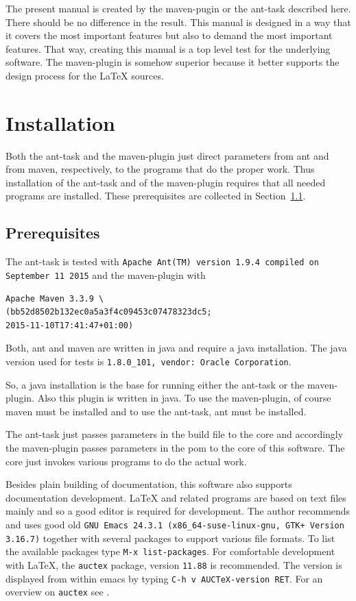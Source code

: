 \documentclass[12pt]{article}
\begin{document}
The present manual is created by the maven-pugin or the ant-task 
described here. 
There should be no difference in the result. 
This manual is designed in a way that it covers the most important features 
but also to demand the most important features. 
That way, creating this manual is a top level test 
for the underlying software. 
The maven-plugin is somehow superior 
because it better supports the design process for the \LaTeX{} sources. 



\section{Installation}

Both the ant-task and the maven-plugin just direct parameters 
from ant and from maven, respectively, 
to the programs that do the proper work. 
Thus installation of the ant-task and of the maven-plugin 
requires that all needed programs are installed. 
These prerequisites are collected in Section~\ref{subsec:prerequisites}. 

\subsection{Prerequisites}\label{subsec:prerequisites}

The ant-task is tested with 
{\tt Apache Ant(TM) version 1.9.4 compiled on September 11 2015}
and the maven-plugin with 
%
\begin{verbatim}
Apache Maven 3.3.9 \
(bb52d8502b132ec0a5a3f4c09453c07478323dc5; 
2015-11-10T17:41:47+01:00)
\end{verbatim}
%
Both, ant and maven are written in java and require a java installation. 
The java\index{java} version used for tests 
is {\tt 1.8.0\_101, vendor: Oracle Corporation}. 


So, a java installation is the base for running either the ant-task 
or the maven-plugin. 
Also this plugin is written in java. 
To use the maven-plugin, of course maven must be installed 
and to use the ant-task, ant must be installed. 

The ant-task just passes parameters in the build file to the core 
and accordingly the maven-plugin passes parameters in the pom 
to the core of this software. 
The core just invokes various programs to do the actual work. 

Besides plain building of documentation, 
this software also supports documentation development. 
\LaTeX{} and related programs are based on text files mainly 
and so a good editor is required for development. 
The author recommends and uses good old 
{\tt GNU Emacs 24.3.1 (x86\_64-suse-linux-gnu, GTK+ Version 3.16.7)} 
together with several packages to support 
various file formats. 
To list the available packages type 
{\tt M-x list-packages}. 
For comfortable development with \LaTeX, 
the {\tt auctex} package, version {\tt 11.88} is recommended. 
The version is displayed from within emacs 
by typing {\tt C-h v AUCTeX-version RET}. 
For an overview on {\tt auctex} see \cite{AucTeX}. 
\end{document}
